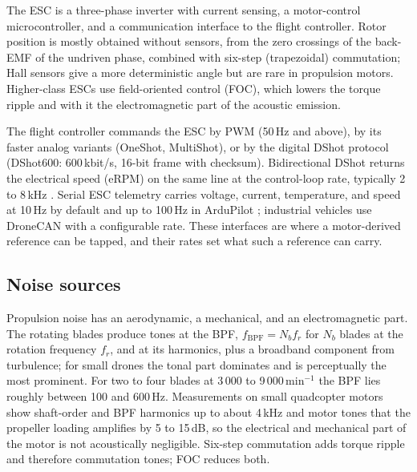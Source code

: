 \documentclass[conference]{IEEEtran}
\begin{document}
The ESC is a three-phase inverter with current sensing, a motor-control microcontroller, and a communication interface to the flight controller. Rotor position is mostly obtained without sensors, from the zero crossings of the back-EMF of the undriven phase, combined with six-step (trapezoidal) commutation; Hall sensors give a more deterministic angle but are rare in propulsion motors. Higher-class ESCs use field-oriented control (FOC), which lowers the torque ripple and with it the electromagnetic part of the acoustic emission.

The flight controller commands the ESC by PWM (50\,Hz and above), by its faster analog variants (OneShot, MultiShot), or by the digital DShot protocol (DShot600: 600\,kbit/s, 16-bit frame with checksum). Bidirectional DShot returns the electrical speed (eRPM) on the same line at the control-loop rate, typically 2 to 8\,kHz \cite{betaflightDshotRpm}. Serial ESC telemetry carries voltage, current, temperature, and speed at 10\,Hz by default and up to 100\,Hz in ArduPilot \cite{ardupilotEscTelemetry}; industrial vehicles use DroneCAN with a configurable rate. These interfaces are where a motor-derived reference can be tapped, and their rates set what such a reference can carry.

\subsection{Noise sources}
Propulsion noise has an aerodynamic, a mechanical, and an electromagnetic part. The rotating blades produce tones at the BPF, $f_{\mathrm{BPF}}=N_b f_r$ for $N_b$ blades at the rotation frequency $f_r$, and at its harmonics, plus a broadband component from turbulence; for small drones the tonal part dominates and is perceptually the most prominent. For two to four blades at 3\,000 to 9\,000\,min$^{-1}$ the BPF lies roughly between 100 and 600\,Hz. Measurements on small quadcopter motors show shaft-order and BPF harmonics up to about 4\,kHz and motor tones that the propeller loading amplifies by 5 to 15\,dB, so the electrical and mechanical part of the motor is not acoustically negligible. Six-step commutation adds torque ripple and therefore commutation tones; FOC reduces both.
\end{document}
